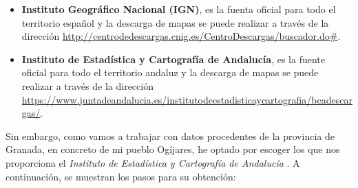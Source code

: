 \begin{itemize}
	\item \textbf{Instituto Geográfico Nacional (IGN)}, es la fuenta oficial para todo el territorio español y la descarga de mapas se puede realizar a través de la dirección \url{http://centrodedescargas.cnig.es/CentroDescargas/buscador.do#}.
	
	\item \textbf{Instituto de Estadística y Cartografía de Andalucía}, es la fuente oficial para todo el territorio andaluz y la descarga de mapas se puede realizar a través de la dirección \url{https://www.juntadeandalucia.es/institutodeestadisticaycartografia/bcadescargas/}.
\end{itemize}
 
Sin embargo, como vamos a trabajar con datos procedentes de la provincia de Granada, en concreto de mi pueblo Ogíjares, he optado por escoger los que nos proporciona el \textit{Instituto de Estadística y Cartografía de Andalucía} \cite{base-andalucia}. A continuación, se muestran los pasos para su obtención:

